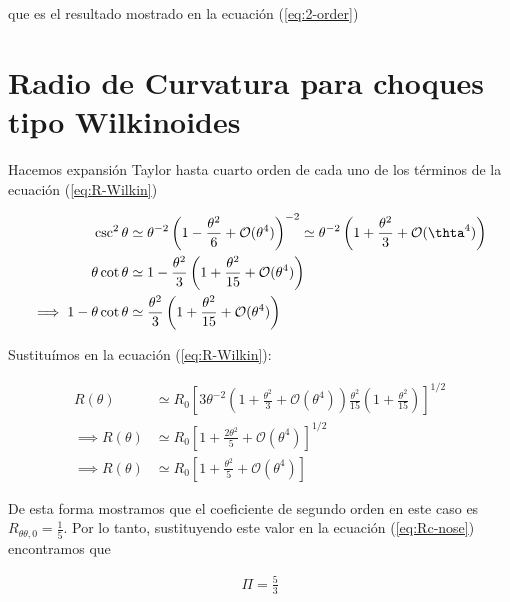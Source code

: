 que es el resultado mostrado en la ecuación (\ref{eq:2-order})

\section{Radio de Curvatura para choques tipo Wilkinoides}
\label{sec:Rc-Wilkin}
Hacemos expansión Taylor hasta cuarto orden de cada uno de los términos de la ecuación (\ref{eq:R-Wilkin})

\begin{align}
  \csc^2\theta &\simeq \theta^{-2}\left(1 - \frac{\theta^2}{6} + \mathcal{O}(\theta^4)\right)^{-2} \simeq
                 \theta^{-2}\left(1 + \frac{\theta^2}{3} + \mathcal{O}(\thta^4)\right) \\
  \theta\cot\theta &\simeq 1 - \frac{\theta^2}{3}\left(1 + \frac{\theta^2}{15} + \mathcal{O}(\theta^4)\right) \\
  \implies 1 -\theta\cot\theta &\simeq \frac{\theta^2}{3}\left(1 + \frac{\theta^2}{15} + \mathcal{O}(\theta^4)\right)
\end{align}

Sustituímos en la ecuación (\ref{eq:R-Wilkin}):

\begin{align}
  R(\theta) &\simeq R_0\left[3\theta^{-2}\left(1 + \frac{\theta^2}{3}+\mathcal{O}(\theta^4)\right)\frac{\theta^2}{15}
  \left(1 + \frac{\theta^2}{15}\right) \right]^{1/2} \\
  \implies R(\theta) &\simeq R_0\left[1 + \frac{2\theta^2}{5} + \mathcal{O}(\theta^4)\right]^{1/2} \\
  \implies R(\theta) &\simeq R_0\left[1 + \frac{\theta^2}{5} + \mathcal{O}(\theta^4)\right]
\end{align}

De esta forma mostramos que el coeficiente de segundo orden en este caso es $R_{\theta \theta, 0} = \frac{1}{5}$. Por lo tanto,
sustituyendo este valor en la ecuación (\ref{eq:Rc-nose}) encontramos que

\begin{align}
  \Pi = \frac{5}{3}
\end{align}
